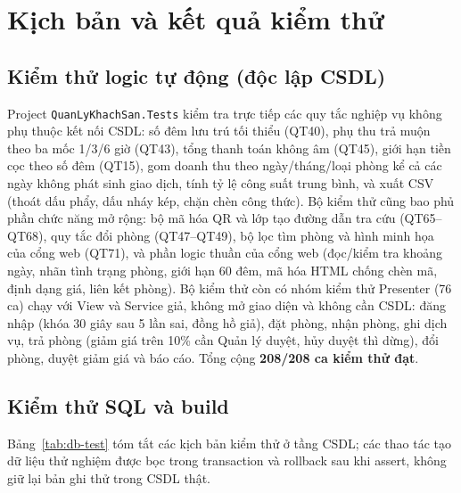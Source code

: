 \documentclass[14pt]{report}
\begin{document}
\section{Kịch bản và kết quả kiểm thử}

\subsection{Kiểm thử logic tự động (độc lập CSDL)}

Project \texttt{QuanLyKhachSan.Tests} kiểm tra trực tiếp các quy tắc nghiệp vụ không phụ thuộc kết nối CSDL: số đêm lưu trú tối thiểu (QT40), phụ thu trả muộn theo ba mốc 1/3/6 giờ (QT43), tổng thanh toán không âm (QT45), giới hạn tiền cọc theo số đêm (QT15), gom doanh thu theo ngày/tháng/loại phòng kể cả các ngày không phát sinh giao dịch, tính tỷ lệ công suất trung bình, và xuất CSV (thoát dấu phẩy, dấu nháy kép, chặn chèn công thức). Bộ kiểm thử cũng bao phủ phần chức năng mở rộng: bộ mã hóa QR và lớp tạo đường dẫn tra cứu (QT65--QT68), quy tắc đổi phòng (QT47--QT49), bộ lọc tìm phòng và hình minh họa của cổng web (QT71), và phần logic thuần của cổng web (đọc/kiểm tra khoảng ngày, nhãn tình trạng phòng, giới hạn 60 đêm, mã hóa HTML chống chèn mã, định dạng giá, liên kết phòng). Bộ kiểm thử còn có nhóm kiểm thử Presenter (76 ca) chạy với View và Service giả, không mở giao diện và không cần CSDL: đăng nhập (khóa 30 giây sau 5 lần sai, đồng hồ giả), đặt phòng, nhận phòng, ghi dịch vụ, trả phòng (giảm giá trên 10\% cần Quản lý duyệt, hủy duyệt thì dừng), đổi phòng, duyệt giảm giá và báo cáo. Tổng cộng \textbf{208/208 ca kiểm thử đạt}.

\subsection{Kiểm thử SQL và build}

Bảng~\ref{tab:db-test} tóm tắt các kịch bản kiểm thử ở tầng CSDL; các thao tác tạo dữ liệu thử nghiệm được bọc trong transaction và rollback sau khi assert, không giữ lại bản ghi thử trong CSDL thật.
\end{document}
